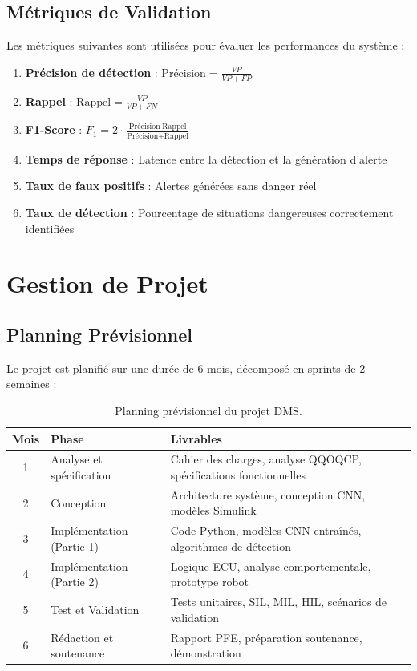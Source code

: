 \documentclass[12pt,a4paper,twoside]{report}
\begin{document}
\subsection{Métriques de Validation}

Les métriques suivantes sont utilisées pour évaluer les performances du système :

\begin{enumerate}[leftmargin=2cm]
    \item \textbf{Précision de détection} : $\text{Précision} = \frac{VP}{VP + FP}$
    \item \textbf{Rappel} : $\text{Rappel} = \frac{VP}{VP + FN}$
    \item \textbf{F1-Score} : $F_1 = 2 \cdot \frac{\text{Précision} \cdot \text{Rappel}}{\text{Précision} + \text{Rappel}}$
    \item \textbf{Temps de réponse} : Latence entre la détection et la génération d'alerte
    \item \textbf{Taux de faux positifs} : Alertes générées sans danger réel
    \item \textbf{Taux de détection} : Pourcentage de situations dangereuses correctement identifiées
\end{enumerate}

\section{Gestion de Projet}

\subsection{Planning Prévisionnel}

Le projet est planifié sur une durée de 6 mois, décomposé en sprints de 2 semaines :

\begin{table}[H]
\centering
\caption{Planning prévisionnel du projet DMS.}
\label{tab:planning}
\renewcommand{\arraystretch}{1.3}
\begin{tabularx}{\textwidth}{|c|l|X|}
\hline
\rowcolor{stellantisblue!15}
\textbf{Mois} & \textbf{Phase} & \textbf{Livrables} \\
\hline
1 & Analyse et spécification & Cahier des charges, analyse QQOQCP, spécifications fonctionnelles \\
\hline
2 & Conception & Architecture système, conception CNN, modèles Simulink \\
\hline
3 & Implémentation (Partie 1) & Code Python, modèles CNN entraînés, algorithmes de détection \\
\hline
4 & Implémentation (Partie 2) & Logique ECU, analyse comportementale, prototype robot \\
\hline
5 & Test et Validation & Tests unitaires, SIL, MIL, HIL, scénarios de validation \\
\hline
6 & Rédaction et soutenance & Rapport PFE, préparation soutenance, démonstration \\
\hline
\end{tabularx}
\end{table}
\end{document}

